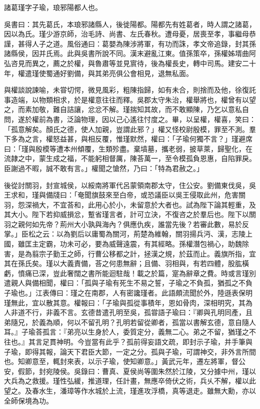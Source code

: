 
\begin{pinyinscope}
諸葛瑾字子瑜，琅邪陽都人也。

吳書曰：其先葛氏，本琅邪諸縣人，後徙陽都。陽都先有姓葛者，時人謂之諸葛，因以為氏。瑾少游京師，治毛詩、尚書、左氏春秋。遭母憂，居喪至孝，事繼母恭謹，甚得人子之道。風俗通曰：葛嬰為陳涉將軍，有功而誅，孝文帝追錄，封其孫諸縣侯，因并氏焉。此與吳書所說不同。漢末避亂江東。值孫策卒，孫權姊壻曲阿弘咨見而異之，薦之於權，與魯肅等並見賔待，後為權長史，轉中司馬。建安二十年，權遣瑾使蜀通好劉備，與其弟亮俱公會相見，退無私面。

與權談說諫喻，未甞切愕，微見風彩，粗陳指歸，如有未合，則捨而及他，徐復託事造端，以物類相求，於是權意往往而釋。吳郡太守朱治，權舉將也，權曾有以望之，而素加敬，難自詰讓，忿忿不解。瑾揣知其故，而不敢顯陳，乃乞以意私自問，遂於權前為書，泛論物理，因以己心遙往忖度之。畢，以呈權，權喜，笑曰：「孤意解矣。顏氏之德，使人加親，豈謂此邪？」權又怪校尉殷模，罪至不測。羣下多為之言，權怒益甚，與相反覆，惟瑾默然，權曰：「子瑜何獨不言？」瑾避席曰：「瑾與殷模等遭本州傾覆，生類殄盡。棄墳墓，攜老弱，披草萊，歸聖化，在流隷之中，蒙生成之福，不能躬相督厲，陳荅萬一，至令模孤負恩惠，自陷罪戾。臣謝過不暇，誠不敢有言。」權聞之愴然，乃曰：「特為君赦之。」

後從討關羽，封宣城侯，以綏南將軍代呂蒙領南郡太守，住公安。劉備東伐吳，吳王求和，瑾與備牋曰：「奄聞旗鼓來至白帝，或恐議臣以吳王侵取此州，危害關羽，怨深禍大，不宜荅和，此用心於小，未留意於大者也。試為陛下論其輕重，及其大小。陛下若抑威損忿，蹔省瑾言者，計可立決，不復咨之於羣后也。陛下以關羽之親何如先帝？荊州大小孰與海內？俱應仇疾，誰當先後？若審此數，易於反掌。」臣松之云：以為劉后以庸蜀為關河，荊楚為維翰，關羽揚兵沔、漢，志陵上國，雖匡主定霸，功未可必，要為威聲遠震，有其經略。孫權潛包禍心，助魏除害，是為翦宗子勤王之師，行曹公移都之計，拯漢之規，於茲而止。義旗所指，宜其在孫氏矣。瑾以大義責備，荅之何患無辭；且備、羽相與，有若四體，股肱橫虧，憤痛已深，豈此奢闊之書所能迴駐哉！載之於篇，寔為辭章之費。時或言瑾別遣親人與備相聞，權曰：「孤與子瑜有死生不易之誓，子瑜之不負孤，猶孤之不負子瑜也。」江表傳曰：瑾之在南郡，人有密讒瑾者。此語頗流聞於外，陸遜表保明瑾無此，宜以散其意。權報曰：「子瑜與孤從事積年，恩如骨肉，深相明究，其為人非道不行，非義不言。玄德昔遣孔明至吳，孤甞語子瑜曰：『卿與孔明同產，且弟隨兄，於義為順，何以不留孔明？孔明若留從卿者，孤當以書解玄德，意自隨人耳。』子瑜荅孤言：『弟亮以生身於人，委質定分，義無二心。弟之不留，猶瑾之不往也。』其言足貫神明。今豈當有此乎？孤前得妄語文疏，即封示子瑜，并手筆與子瑜，即得其報，論天下君臣大節，一定之分。孤與子瑜，可謂神交，非外言所間也。知卿意至，輒封來表，以示子瑜，使知卿意。」黃武元年，遷左將軍，督公安，假節，封宛陵侯。吳錄曰：曹真、夏侯尚等圍朱然於江陵，又分據中州，瑾以大兵為之救援。瑾性弘緩，推道理，任計畫，無應卒倚伏之術，兵乆不解，權以此望之。及春水生，潘璋等作水城於上流，瑾進攻浮橋，真等退走。雖無大勳，亦以全師保境為功。


\end{pinyinscope}
